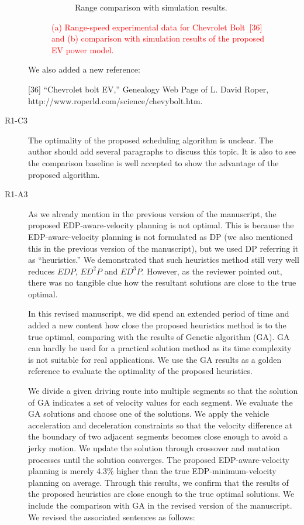 \documentclass[onecolumn]{IEEEconf}
\begin{document}
\begin{description}
\begin{figure} [h!]
\begin{subfigure}{0.47\textwidth}
	\caption{Range comparison with simulation results.}
	\label{fig:range_speed_valid}
	\end{subfigure}
\caption{\textcolor{red}{(a) Range-speed experimental data for Chevrolet Bolt~[36] and (b) comparison with simulation results of the proposed EV power model.}}
\end{figure}

We also added a new reference:

[36] ``Chevrolet bolt EV,'' Genealogy Web Page of L. David Roper, http://www.roperld.com/science/chevybolt.htm.

\item [R1-C3] The optimality of the proposed scheduling algorithm is unclear. The author should add several paragraphs to discuss this topic. It is also to see the comparison baseline is well accepted to show the advantage of the proposed algorithm.

\item [R1-A3] As we already mention in the previous version of the manuscript, the proposed EDP-aware-velocity planning is not optimal. This is because the EDP-aware-velocity planning is not formulated as DP (we also mentioned this in the previous version of the manuscript), but we used DP referring it as ``heuristics.'' We demonstrated that such heuristics method still very well reduces $EDP$, $ED^2P$ and $ED^3P$. However, as the reviewer pointed out, there was no tangible clue how the resultant solutions are close to the true optimal.

In this revised manuscript, we did spend an extended period of time and added a new content  how close the proposed heuristics method is to the true optimal, comparing with the results of Genetic algorithm (GA). GA can hardly be used for a practical solution method as its time complexity is not suitable for real applications. We use the GA results as a golden reference to evaluate the optimality of the proposed heuristics.

We divide a given driving route into multiple segments so that the solution of GA indicates a set of velocity values for each segment. We evaluate the GA solutions and choose one of the solutions. We apply the vehicle acceleration and deceleration constraints so that the velocity difference at the boundary of two adjacent segments becomes close enough to avoid a jerky motion. We update the solution through crossover and mutation processes until the solution converges. The proposed EDP-aware-velocity planning is merely 4.3\% higher than the true EDP-minimum-velocity planning on average. Through this results, we confirm that the results of the proposed heuristics are close enough to the true optimal solutions. We include the comparison with GA in the revised version of the manuscript. We revised the associated sentences as follows:\\


\end{description}
\end{document}
